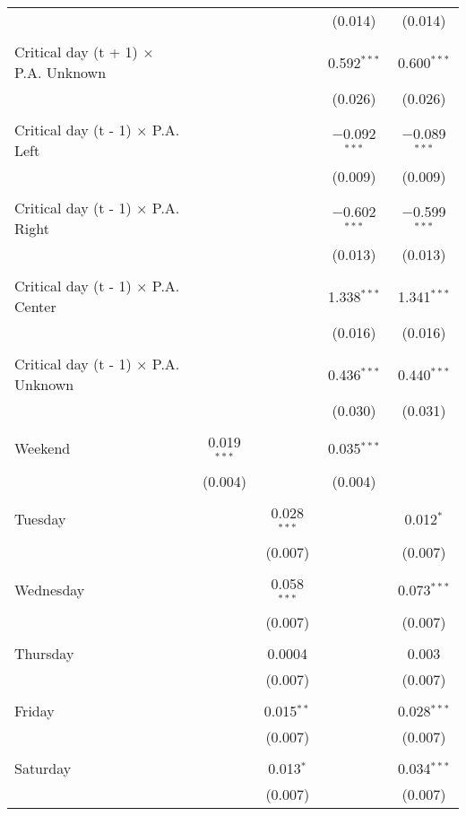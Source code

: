 \documentclass[
]{article}
\begin{document}
\begin{table}[!htbp]
{\begin{tabular}{@{\extracolsep{5pt}}lcccc}
  &  &  & (0.014) & (0.014) \\ 
  & & & & \\ 
 Critical day (t + 1) $\times$ P.A. Unknown &  &  & 0.592$^{***}$ & 0.600$^{***}$ \\ 
  &  &  & (0.026) & (0.026) \\ 
  & & & & \\ 
 Critical day (t - 1) $\times$ P.A. Left &  &  & $-$0.092$^{***}$ & $-$0.089$^{***}$ \\ 
  &  &  & (0.009) & (0.009) \\ 
  & & & & \\ 
 Critical day (t - 1) $\times$ P.A. Right &  &  & $-$0.602$^{***}$ & $-$0.599$^{***}$ \\ 
  &  &  & (0.013) & (0.013) \\ 
  & & & & \\ 
 Critical day (t - 1) $\times$ P.A. Center &  &  & 1.338$^{***}$ & 1.341$^{***}$ \\ 
  &  &  & (0.016) & (0.016) \\ 
  & & & & \\ 
 Critical day (t - 1) $\times$ P.A. Unknown &  &  & 0.436$^{***}$ & 0.440$^{***}$ \\ 
  &  &  & (0.030) & (0.031) \\ 
  & & & & \\ 
 Weekend & 0.019$^{***}$ &  & 0.035$^{***}$ &  \\ 
  & (0.004) &  & (0.004) &  \\ 
  & & & & \\ 
 Tuesday &  & 0.028$^{***}$ &  & 0.012$^{*}$ \\ 
  &  & (0.007) &  & (0.007) \\ 
  & & & & \\ 
 Wednesday &  & 0.058$^{***}$ &  & 0.073$^{***}$ \\ 
  &  & (0.007) &  & (0.007) \\ 
  & & & & \\ 
 Thursday &  & 0.0004 &  & 0.003 \\ 
  &  & (0.007) &  & (0.007) \\ 
  & & & & \\ 
 Friday &  & 0.015$^{**}$ &  & 0.028$^{***}$ \\ 
  &  & (0.007) &  & (0.007) \\ 
  & & & & \\ 
 Saturday &  & 0.013$^{*}$ &  & 0.034$^{***}$ \\ 
  &  & (0.007) &  & (0.007) \\ 

\end{tabular}}
\end{table}
\end{document}
